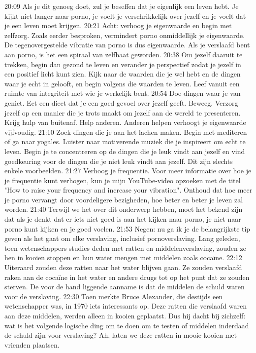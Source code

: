 20:09
Als je dit genoeg doet, zul je beseffen dat je eigenlijk een leven hebt. Je kijkt niet langer naar porno, je voelt je verschrikkelijk over jezelf en je voelt dat je een leven moet krijgen.
20:21
Acht: verhoog je eigenwaarde en begin met zelfzorg. Zoals eerder besproken, vermindert porno onmiddellijk je eigenwaarde. De tegenovergestelde vibratie van porno is dus eigenwaarde. Als je verslaafd bent aan porno, is het een spiraal van zelfhaat geworden.
20:38
Om jezelf daaruit te trekken, begin dan gezond te leven en verander je perspectief zodat je jezelf in een positief licht kunt zien. Kijk naar de waarden die je wel hebt en de dingen waar je echt in gelooft, en begin volgens die waarden te leven. Leef vanuit een ruimte van integriteit met wie je werkelijk bent.
20:54
Doe dingen waar je van geniet. Eet een dieet dat je een goed gevoel over jezelf geeft. Beweeg. Verzorg jezelf op een manier die je trots maakt om jezelf aan de wereld te presenteren. Krijg hulp van buitenaf. Help anderen. Anderen helpen verhoogt je eigenwaarde vijfvoudig.
21:10
Zoek dingen die je aan het lachen maken. Begin met mediteren of ga naar yogales. Luister naar motiverende muziek die je inspireert om echt te leven. Begin je te concentreren op de dingen die je leuk vindt aan jezelf en vind goedkeuring voor de dingen die je niet leuk vindt aan jezelf. Dit zijn slechts enkele voorbeelden.
21:27
Verhoog je frequentie. Voor meer informatie over hoe je je frequentie kunt verhogen, kun je mijn YouTube-video opzoeken met de titel "How to raise your frequency and increase your vibration". Onthoud dat hoe meer je porno vervangt door voordeligere bezigheden, hoe beter en beter je leven zal worden.
21:40
Terwijl we het over dit onderwerp hebben, moet het bekend zijn dat als je denkt dat er iets niet goed is aan het kijken naar porno, je niet naar porno kunt kijken en je goed voelen.
21:53
Negen: nu ga ik je de belangrijkste tip geven als het gaat om elke verslaving, inclusief pornoverslaving. Lang geleden, toen wetenschappers studies deden met ratten en middelenverslaving, zouden ze hen in kooien stoppen en hun water mengen met middelen zoals cocaïne.
22:12
Uiteraard zouden deze ratten naar het water blijven gaan. Ze zouden verslaafd raken aan de cocaïne in het water en andere drugs tot op het punt dat ze zouden sterven. De voor de hand liggende aanname is dat de middelen de schuld waren voor de verslaving.
22:30
Toen merkte Bruce Alexander, die destijds een wetenschapper was, in 1970 iets interessants op. Deze ratten die verslaafd waren aan deze middelen, werden alleen in kooien geplaatst. Dus hij dacht bij zichzelf: wat is het volgende logische ding om te doen om te testen of middelen inderdaad de schuld zijn voor verslaving? Ah, laten we deze ratten in mooie kooien met vrienden plaatsen.
